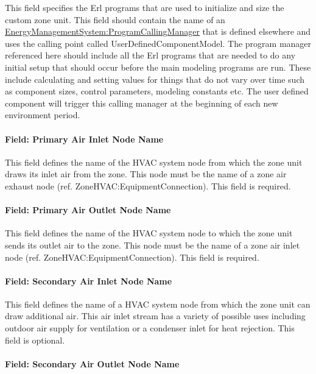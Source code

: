 This field specifies the Erl programs that are used to initialize and size the custom zone unit. This field should contain the name of an \hyperref[energymanagementsystemprogramcallingmanager]{EnergyManagementSystem:ProgramCallingManager} that is defined elsewhere and uses the calling point called UserDefinedComponentModel. The program manager referenced here should include all the Erl programs that are needed to do any initial setup that should occur before the main modeling programs are run. These include calculating and setting values for things that do not vary over time such as component sizes, control parameters, modeling constants etc. The user defined component will trigger this calling manager at the beginning of each new environment period.

\paragraph{Field: Primary Air Inlet Node Name}\label{field-primary-air-inlet-node-name-001}

This field defines the name of the HVAC system node from which the zone unit draws its inlet air from the zone. This node must be the name of a zone air exhaust node (ref. ZoneHVAC:EquipmentConnection). This field is required.

\paragraph{Field: Primary Air Outlet Node Name}\label{field-primary-air-outlet-node-name-001}

This field defines the name of the HVAC system node to which the zone unit sends its outlet air to the zone. This node must be the name of a zone air inlet node (ref. ZoneHVAC:EquipmentConnection). This field is required.

\paragraph{Field: Secondary Air Inlet Node Name}\label{field-secondary-air-inlet-node-name-002}

This field defines the name of a HVAC system node from which the zone unit can draw additional air. This air inlet stream has a variety of possible uses including outdoor air supply for ventilation or a condenser inlet for heat rejection. This field is optional.

\paragraph{Field: Secondary Air Outlet Node Name}\label{field-secondary-air-outlet-node-name-001}


